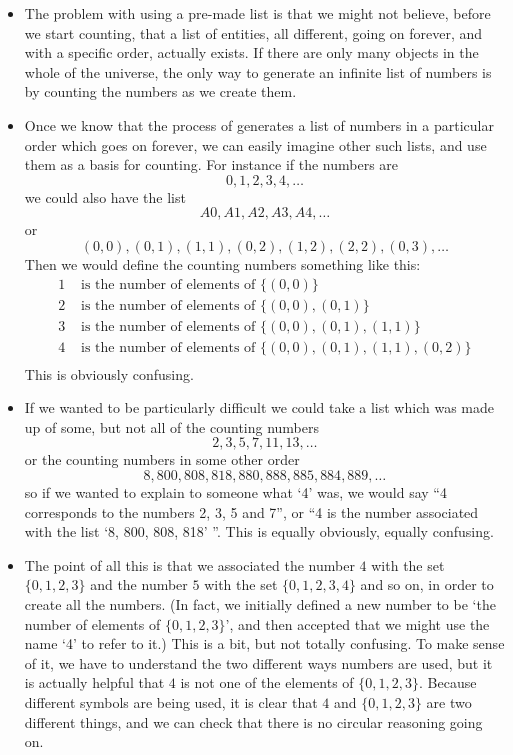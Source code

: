 \begin{itemize}
\item
The problem with using a pre-made list is that we might not believe, before we start counting, that a list of entities, all different, going on forever, and with a specific order, actually exists. If there are only  many objects in the whole of the universe, the only way to generate an infinite list of numbers is by counting the numbers as we create them.
\item
Once we know that the process of  generates a list of numbers in a particular order which goes on forever, we can easily imagine other such lists, and use them as a basis for counting. For instance if the numbers are 
\[ 0, 1, 2, 3, 4, \ldots \] 
we could also have the list 
\[ A0, A1, A2, A3, A4, \ldots \]
or 
\[ (0,0), (0,1), (1,1), (0,2), (1,2), (2,2), (0,3), \ldots \]
Then we would define the counting numbers something like this:
\begin{align*}
1 &\text{ is the number of elements of } \{(0,0)\}\\
2 &\text{ is the number of elements of } \{(0,0), (0,1)\}\\
3 &\text{ is the number of elements of } \{(0,0), (0,1), (1,1)\}\\
4 &\text{ is the number of elements of } \{(0,0), (0,1), (1,1), (0,2)\}\\
\end{align*}
This is obviously confusing.
\item
If we wanted to be particularly difficult we could take a list which was made up of some, but not all of the counting numbers
\[ 2, 3, 5, 7, 11, 13, \ldots \]
or the counting numbers in some other order
\[ 8, 800, 808, 818, 880, 888, 885, 884, 889, \ldots \]
so if we wanted to explain to someone what `4' was, we would say ``4 corresponds to the numbers 2, 3, 5 and 7'', or ``4 is the number associated with the list `8, 800, 808, 818' ''.
This is equally obviously, equally confusing.
\item
The point of all this is that we associated the number $4$ with the set $\{0, 1, 2, 3\}$ and the number $5$ with the set $\{0,1,2,3,4\}$ and so on, in order to create all the numbers. (In fact, we initially defined a new number to be `the number of elements of $\{0,1,2,3\}$', and then accepted that we might use the name `4' to refer to it.) This is a bit, but not totally confusing. To make sense of it, we have to understand the two different ways numbers are used, but it is actually helpful that $4$ is not one of the elements of $\{0,1,2,3\}$. Because different symbols are being used, it is clear that $4$ and $\{0,1,2,3\}$ are two different things, and we can check that there is no circular reasoning going on.

\end{itemize}
